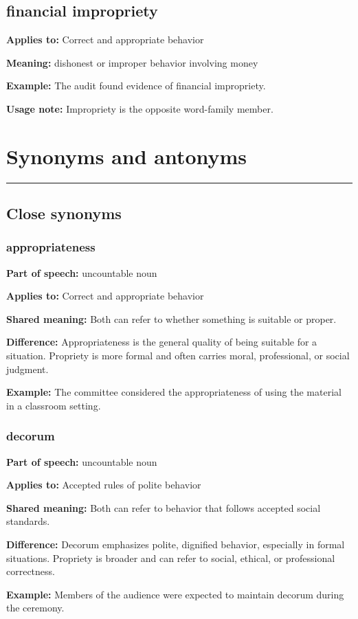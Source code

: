 \documentclass[11pt]{article}
\newcommand{\sectionrule}{\par\vspace{-0.5em}\noindent\textcolor{Accent}{\rule{\linewidth}{0.6pt}}\par}
\begin{document}
\subsection{financial impropriety}
\textbf{Applies to:} Correct and appropriate behavior

\textbf{Meaning:} dishonest or improper behavior involving money

\textbf{Example:} The audit found evidence of financial impropriety.

\textbf{Usage note:} Impropriety is the opposite word-family member.

\section{Synonyms and antonyms}
\sectionrule
\subsection{Close synonyms}
\subsubsection{appropriateness}
\textbf{Part of speech:} uncountable noun

\textbf{Applies to:} Correct and appropriate behavior

\textbf{Shared meaning:} Both can refer to whether something is suitable or proper.

\textbf{Difference:} Appropriateness is the general quality of being suitable for a situation. Propriety is more formal and often carries moral, professional, or social judgment.

\textbf{Example:} The committee considered the appropriateness of using the material in a classroom setting.

\subsubsection{decorum}
\textbf{Part of speech:} uncountable noun

\textbf{Applies to:} Accepted rules of polite behavior

\textbf{Shared meaning:} Both can refer to behavior that follows accepted social standards.

\textbf{Difference:} Decorum emphasizes polite, dignified behavior, especially in formal situations. Propriety is broader and can refer to social, ethical, or professional correctness.

\textbf{Example:} Members of the audience were expected to maintain decorum during the ceremony.
\end{document}
